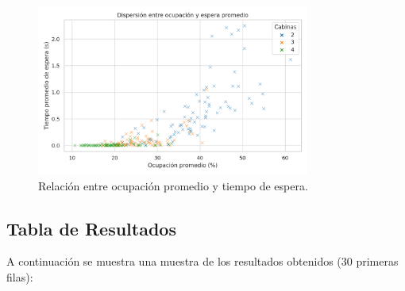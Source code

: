 \documentclass[12pt]{article}
\begin{document}
\begin{figure}[H]
\centering
\includegraphics[width=0.8\textwidth]{scatter_ocupacion.png}
\caption{Relación entre ocupación promedio y tiempo de espera.}
\end{figure}

\subsection*{Tabla de Resultados}
A continuación se muestra una muestra de los resultados obtenidos (30 primeras filas):
\end{document}
